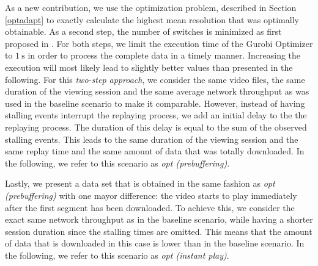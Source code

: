 As a new contribution, we use the optimization problem, described in Section \ref{optadapt} to exactly calculate the highest mean resolution that was optimally obtainable. As a second step, the number of switches is minimized as first proposed in \cite{miller2013optimal}. For both steps, we limit the execution time of the Gurobi Optimizer to $\SI{1}{\second}$ in order to process the complete data in a timely manner. Increasing the execution will most likely lead to slightly better values than presented in the following. For this \textit{two-step approach}, we consider the same video files, the same duration of the viewing session and the same average network throughput as was used in the baseline scenario to make it comparable. However, instead of having stalling events interrupt the replaying process, we add an initial delay to the the replaying process. The duration of this delay is equal to the sum of the observed stalling events. This leads to the same duration of the viewing session and the same replay time and the same amount of data that was totally downloaded. In the following, we refer to this scenario as \textit{opt (prebuffering)}.

Lastly, we present a data set that is obtained in the same fashion as \textit{opt (prebuffering)} with one mayor difference: the video starts to play immediately after the first segment has been downloaded. To achieve this, we consider the exact same network throughput as in the baseline scenario, while having a shorter session duration since the stalling times are omitted. This means that the amount of data that is downloaded in this case is lower than in the baseline scenario. In the following, we refer to this scenario as \textit{opt (instant play)}.
